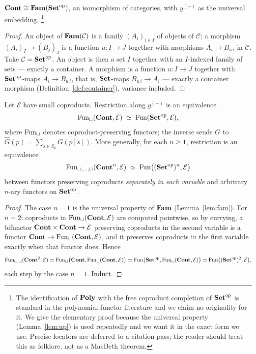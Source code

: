 \begin{Lemma}
\label{lem:fam}
$\mathbf{Cont}\cong\mathbf{Fam}(\mathbf{Set}^{\mathrm{op}})$, an isomorphism of categories, with
$y^{(-)}$ as the universal embedding.
%
\footnote{The identification of $\mathbf{Poly}$ with the free coproduct completion of
$\mathbf{Set}^{\mathrm{op}}$ is standard in the polynomial-functor literature and we
claim no originality for it. We give the elementary proof because the universal
property (Lemma~\ref{lem:up}) is used repeatedly and we want it in the exact
form we use. Precise locators are deferred to a citation pass; the reader should
treat this as folklore, not as a MacBeth theorem.}
\end{Lemma}

\begin{proof}
An object of $\mathbf{Fam}(\mathcal C)$ is a family $(A_i)_{i\in I}$ of objects of
$\mathcal C$; a morphism $(A_i)_I\to(B_j)_J$ is a function $u\colon I\to J$
together with morphisms $A_i\to B_{u\,i}$ in $\mathcal C$. Take
$\mathcal C=\mathbf{Set}^{\mathrm{op}}$. An object is then a set $I$ together with an
$I$-indexed family of sets --- exactly a container. A morphism is a function
$u\colon I\to J$ together with $\mathbf{Set}^{\mathrm{op}}$-maps $A_i\to B_{u\,i}$, that
is, $\mathbf{Set}$-maps $B_{u\,i}\to A_i$ --- exactly a container morphism
(Definition~\ref{def:container}), variance included.
\end{proof}

\begin{Lemma}\label{lem:up}
Let $\mathcal E$ have small coproducts. Restriction along $y^{(-)}$ is an
equivalence
\[
  \operatorname{Fun}_{\sqcup}(\mathbf{Cont},\mathcal E)\;\simeq\;\operatorname{Fun}(\mathbf{Set}^{\mathrm{op}},\mathcal E),
\]
where $\operatorname{Fun}_\sqcup$ denotes coproduct-preserving functors; the inverse sends $G$
to $\widehat G(p)=\sum_{s\in S_p} G(p[s])$. More generally, for each $n\ge 1$,
restriction is an equivalence
\[
  \operatorname{Fun}_{\sqcup,\dots,\sqcup}(\mathbf{Cont}^n,\mathcal E)\;\simeq\;
  \operatorname{Fun}\bigl((\mathbf{Set}^{\mathrm{op}})^n,\mathcal E\bigr)
\]
between functors preserving coproducts \emph{separately in each variable} and
arbitrary $n$-ary functors on $\mathbf{Set}^{\mathrm{op}}$.
\end{Lemma}

\begin{proof}
The case $n=1$ is the universal property of $\mathbf{Fam}$ (Lemma~\ref{lem:fam}). For
$n=2$: coproducts in $\operatorname{Fun}_\sqcup(\mathbf{Cont},\mathcal E)$ are computed pointwise, so
by currying, a bifunctor $\mathbf{Cont}\times\mathbf{Cont}\to\mathcal E$ preserving coproducts in
the second variable is a functor $\mathbf{Cont}\to\operatorname{Fun}_\sqcup(\mathbf{Cont},\mathcal E)$, and it
preserves coproducts in the first variable exactly when that functor does. Hence
\[
\operatorname{Fun}_{\sqcup,\sqcup}(\mathbf{Cont}^2,\mathcal E)
 \simeq\operatorname{Fun}_\sqcup\bigl(\mathbf{Cont},\operatorname{Fun}_\sqcup(\mathbf{Cont},\mathcal E)\bigr)
 \simeq\operatorname{Fun}\bigl(\mathbf{Set}^{\mathrm{op}},\operatorname{Fun}_\sqcup(\mathbf{Cont},\mathcal E)\bigr)
 \simeq\operatorname{Fun}\bigl((\mathbf{Set}^{\mathrm{op}})^2,\mathcal E\bigr),
\]
each step by the case $n=1$. Induct.
\end{proof}

